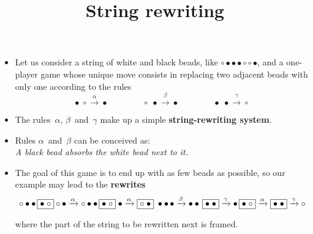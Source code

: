 \documentclass[wide]{slides}
\begin{document}
\begin{slide}
  \title{String rewriting}

  \begin{itemize}

    \item Let us consider a string of white and black beads, like
      \(\circ \bullet \bullet \bullet \circ \circ \bullet\), and a
      one-player game whose unique move consists in replacing two
      adjacent beads with only one according to the rules
      \begin{equation*}
        \bullet \; \circ   \xrightarrow{\alpha} \bullet\qquad\qquad
        \circ   \; \bullet \xrightarrow{\beta} \bullet\qquad\qquad
        \bullet \; \bullet \xrightarrow{\gamma} \circ
      \end{equation*}

    \item The rules~\(\alpha\), \(\beta\)~and~\(\gamma\) make up a
      simple \textbf{string\hyp{}rewriting system}.

    \item Rules \(\alpha\)~and~\(\beta\) can be conceived
      as:\\ \emph{A black bead absorbs the white bead next to it.}

    \item The goal of this game is to end up with as few beads as
      possible, so our example may lead to the \textbf{rewrites}
      \begin{equation*}
        \circ \bullet \bullet \, \fbox{\(\bullet\; \circ\)} \circ
        \bullet \xrightarrow{\alpha} \circ \bullet \bullet \,
        \fbox{\(\bullet\; \circ\)} \; \bullet
        \xrightarrow{\alpha} \fbox{\(\circ \; \bullet\)} \;
        \bullet \bullet \,\bullet \xrightarrow{\beta} \bullet
        \bullet \, \fbox{\(\bullet \; \bullet\)}
        \xrightarrow{\gamma} \bullet \, \fbox{\(\bullet \;
          \circ\)} \xrightarrow{\alpha} \fbox{\(\bullet \;
          \bullet\)} \xrightarrow{\gamma} \circ
      \end{equation*}

      \medskip
      \noindent where the part of the string to be rewritten next is
      framed.

  \end{itemize}

\end{slide}
\end{document}
